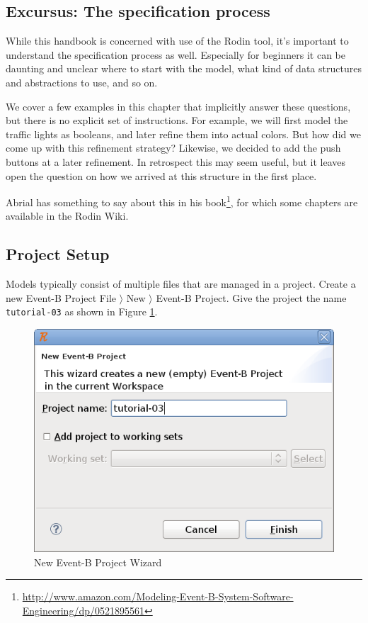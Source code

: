 \subsection{Excursus: The specification process}

While this handbook is concerned with use of the Rodin tool, it's important to understand the specification process as well.  Especially for beginners it can be daunting and unclear where to start with the model, what kind of data structures and abstractions to use, and so on.

We cover a few examples in this chapter that implicitly answer these questions, but there is no explicit set of instructions.  For example, we will first model the traffic lights as booleans, and later refine them into actual colors.  But how did we come up with this refinement strategy?  Likewise, we decided to add the push buttons at a later refinement.  In retrospect this may seem useful, but it leaves open the question on how we arrived at this structure in the first place.

Abrial has something to say about this in his book\footnote{\url{http://www.amazon.com/Modeling-Event-B-System-Software-Engineering/dp/0521895561}}, for which some chapters are available in the Rodin Wiki.

\subsection{Project Setup}
\label{tut_project_setup}

Models typically consist of multiple files that are managed in a project.  Create a new Event-B Project \textsf{File $\rangle$ New $\rangle$ Event-B Project}.  Give the project the name \texttt{tutorial-03} as shown in Figure \ref{fig_tut_03_new_project_wizard}.

\begin{figure}[!ht]
\begin{center}
	\includegraphics[]{img/tutorial/tut_03_tutorial-3.png}
	\caption{New Event-B Project Wizard}
	\label{fig_tut_03_new_project_wizard}
\end{center}
\end{figure}

